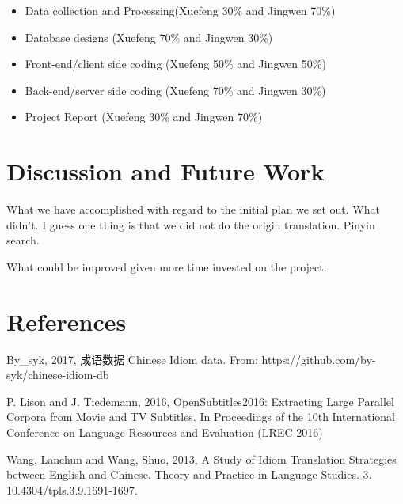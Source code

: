 \documentclass[11pt]{article} %
\begin{document}
\begin{itemize}
	\item Data collection and Processing(Xuefeng 30\% and Jingwen 70\%)
    \item Database designs (Xuefeng 70\% and Jingwen 30\%)
    \item Front-end/client side coding (Xuefeng 50\% and Jingwen 50\%)
    \item Back-end/server side coding (Xuefeng 70\% and Jingwen 30\%)
    \item Project Report (Xuefeng 30\% and Jingwen 70\%)
\end{itemize}

\section{Discussion and Future Work}
\indent What we have accomplished with regard to the initial plan we set out. What didn't. I guess one thing is that we did not do the origin translation. Pinyin search.

\indent What could be improved given more time invested on the project. 



\section{References}

By\_syk, 2017, 成语数据 Chinese Idiom data. From: https://github.com/by-syk/chinese-idiom-db

P. Lison and J. Tiedemann, 2016, OpenSubtitles2016: Extracting Large Parallel Corpora from Movie and TV Subtitles. In Proceedings of the 10th International Conference on Language Resources and Evaluation (LREC 2016)

Wang, Lanchun and Wang, Shuo,  2013, A Study of Idiom Translation Strategies between English and Chinese. Theory and Practice in Language Studies. 3. 10.4304/tpls.3.9.1691-1697. 
\end{document}
